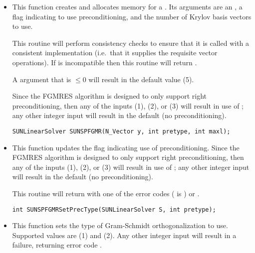 \begin{itemize}


\item {}

  This function creates and allocates memory for a {\spfgmr}
  .  Its arguments are an {\nvector}, a flag
  indicating to use preconditioning, and the number of Krylov basis
  vectors to use. 

  This routine will perform consistency checks to ensure that it is
  called with a consistent {\nvector} implementation (i.e.~that it
  supplies the requisite vector operations).  If  is
  incompatible then this routine will return .

  A  argument that is $\le0$ will result in the default
  value (5).

  Since the FGMRES algorithm is designed to only support right
  preconditioning, then any of the 
  inputs  (1),  (2), or 
  (3) will result in use of ;  any other integer input
  will result in the default (no preconditioning).

  \verb|SUNLinearSolver SUNSPFGMR(N_Vector y, int pretype, int maxl);|


\item {}

  This function updates the flag indicating use of preconditioning.
  Since the FGMRES algorithm is designed to only support right
  preconditioning, then any of the 
  inputs  (1),  (2), or 
  (3) will result in use of ;  any other integer input
  will result in the default (no preconditioning).

  This routine will return with one of the error codes
   ( is ) or .
  
  \verb|int SUNSPFGMRSetPrecType(SUNLinearSolver S, int pretype);|


\item {}

  This function sets the type of Gram-Schmidt orthogonalization to
  use.  Supported values are  (1) and
   (2).  Any other integer input will result in a
  failure, returning error code .


\end{itemize}
